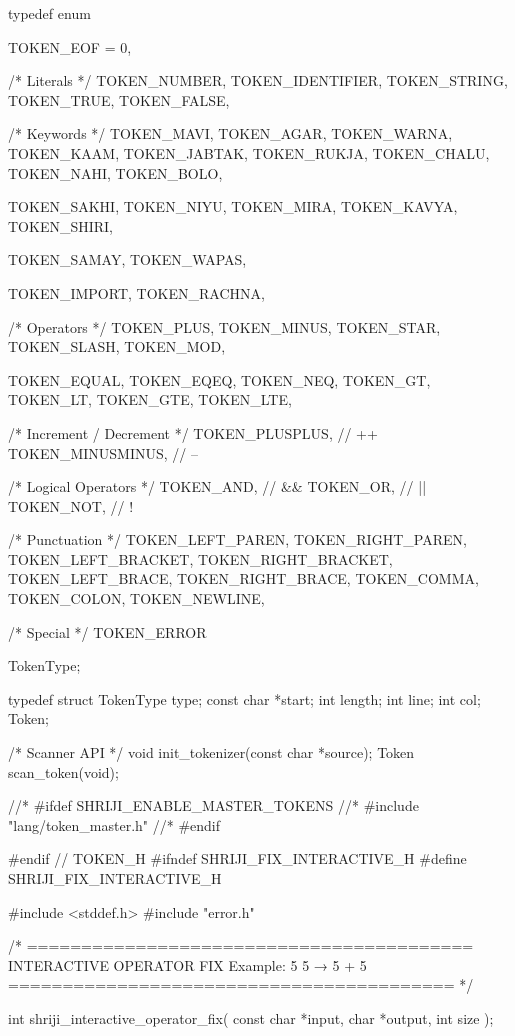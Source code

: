 \documentclass{article}
\begin{document}
typedef enum {

    TOKEN_EOF = 0,

    /* Literals */
    TOKEN_NUMBER,
    TOKEN_IDENTIFIER,
    TOKEN_STRING,
    TOKEN_TRUE,
    TOKEN_FALSE,

    /* Keywords */
    TOKEN_MAVI,
    TOKEN_AGAR,
    TOKEN_WARNA,
    TOKEN_KAAM,
    TOKEN_JABTAK,
    TOKEN_RUKJA,
    TOKEN_CHALU,
    TOKEN_NAHI,
    TOKEN_BOLO,

    TOKEN_SAKHI,
    TOKEN_NIYU,
    TOKEN_MIRA,
    TOKEN_KAVYA,
    TOKEN_SHIRI,

    TOKEN_SAMAY,
    TOKEN_WAPAS,

    TOKEN_IMPORT,
    TOKEN_RACHNA,

    /* Operators */
    TOKEN_PLUS,
    TOKEN_MINUS,
    TOKEN_STAR,
    TOKEN_SLASH,
    TOKEN_MOD,

    TOKEN_EQUAL,
    TOKEN_EQEQ,
    TOKEN_NEQ,
    TOKEN_GT,
    TOKEN_LT,
    TOKEN_GTE,
    TOKEN_LTE,

/* Increment / Decrement */
TOKEN_PLUSPLUS,     // ++
TOKEN_MINUSMINUS,   // --

/* Logical Operators */
TOKEN_AND,          // &&
TOKEN_OR,           // ||
TOKEN_NOT,          // !

    /* Punctuation */
    TOKEN_LEFT_PAREN,
    TOKEN_RIGHT_PAREN,
    TOKEN_LEFT_BRACKET,
    TOKEN_RIGHT_BRACKET,
    TOKEN_LEFT_BRACE,
    TOKEN_RIGHT_BRACE,
    TOKEN_COMMA,
    TOKEN_COLON,
    TOKEN_NEWLINE,

    /* Special */
    TOKEN_ERROR

} TokenType;

typedef struct {
    TokenType type;
    const char *start;
    int length;
    int line;
    int col;
} Token;

/* Scanner API */
void init_tokenizer(const char *source);
Token scan_token(void);

//* #ifdef SHRIJI_ENABLE_MASTER_TOKENS
//* #include "lang/token_master.h"
//* #endif

#endif // TOKEN_H
#ifndef SHRIJI_FIX_INTERACTIVE_H
#define SHRIJI_FIX_INTERACTIVE_H

#include <stddef.h>
#include "error.h"


/* =========================================
   INTERACTIVE OPERATOR FIX
   Example: 5 5 → 5 + 5
   ========================================= */

int shriji_interactive_operator_fix(
    const char *input,
    char *output,
    int size
);
\end{document}
